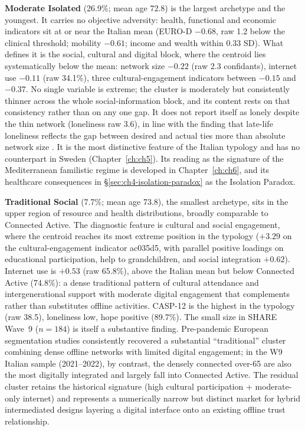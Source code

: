 \label{sec:ch4-moderate-isolated}
\textbf{Moderate Isolated} (26.9\%; mean age 72.8) is the largest archetype and the youngest. It carries no objective adversity: health, functional and economic indicators sit at or near the Italian mean (EURO-D $-0.68$, raw 1.2 below the clinical threshold; mobility $-0.61$; income and wealth within 0.33 SD). What defines it is the social, cultural and digital block, where the centroid lies systematically below the mean: network size $-0.22$ (raw 2.3 confidants), internet use $-0.11$ (raw 34.1\%), three cultural-engagement indicators between $-0.15$ and $-0.37$. No single variable is extreme; the cluster is moderately but consistently thinner across the whole social-information block, and its content rests on that consistency rather than on any one gap. It does not report itself as lonely despite the thin network (loneliness raw 3.6), in line with the finding that late-life loneliness reflects the gap between desired and actual ties more than absolute network size \citep{hawkleycacioppo2010}. It is the most distinctive feature of the Italian typology and has no counterpart in Sweden (Chapter~\ref{ch:ch5}). Its reading as the signature of the Mediterranean familistic regime is developed in Chapter~\ref{ch:ch6}, and its healthcare consequences in \S\ref{sec:ch4-isolation-paradox} as the Isolation Paradox.

\label{sec:ch4-traditional-social}
\textbf{Traditional Social} (7.7\%; mean age 73.8), the smallest archetype, sits in the upper region of resource and health distributions, broadly comparable to Connected Active. The diagnostic feature is cultural and social engagement, where the centroid reaches its most extreme position in the typology ($+3.29$ on the cultural-engagement indicator ac035d5, with parallel positive loadings on educational participation, help to grandchildren, and social integration $+0.62$). Internet use is $+0.53$ (raw 65.8\%), above the Italian mean but below Connected Active (74.8\%): a dense traditional pattern of cultural attendance and intergenerational support with moderate digital engagement that complements rather than substitutes offline activities. CASP-12 is the highest in the typology (raw 38.5), loneliness low, hope positive (89.7\%). The small size in SHARE Wave~9 ($n = 184$) is itself a substantive finding. Pre-pandemic European segmentation studies consistently recovered a substantial ``traditional'' cluster combining dense offline networks with limited digital engagement; in the W9 Italian sample (2021--2022), by contrast, the densely connected over-65 are also the most digitally integrated and largely fall into Connected Active. The residual cluster retains the historical signature (high cultural participation + moderate-only internet) and represents a numerically narrow but distinct market for hybrid intermediated designs layering a digital interface onto an existing offline trust relationship.

